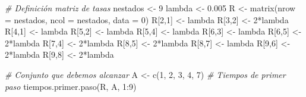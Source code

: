 \documentclass[
]{book}
\newenvironment{Shaded}{\begin{snugshade}}{\end{snugshade}}
\newcommand{\AttributeTok}[1]{\textcolor[rgb]{0.77,0.63,0.00}{#1}}
\newcommand{\CommentTok}[1]{\textcolor[rgb]{0.56,0.35,0.01}{\textit{#1}}}
\newcommand{\DecValTok}[1]{\textcolor[rgb]{0.00,0.00,0.81}{#1}}
\newcommand{\FloatTok}[1]{\textcolor[rgb]{0.00,0.00,0.81}{#1}}
\newcommand{\FunctionTok}[1]{\textcolor[rgb]{0.00,0.00,0.00}{#1}}
\newcommand{\NormalTok}[1]{#1}
\newcommand{\OtherTok}[1]{\textcolor[rgb]{0.56,0.35,0.01}{#1}}
\newcommand{\SpecialCharTok}[1]{\textcolor[rgb]{0.00,0.00,0.00}{#1}}
\theoremstyle{definition}
\theoremstyle{definition}
\theoremstyle{definition}
\theoremstyle{definition}
\theoremstyle{remark}
\begin{document}
\begin{Shaded}
\begin{Highlighting}[]
\CommentTok{\# Definición matriz de tasas}
\NormalTok{nestados }\OtherTok{\textless{}{-}} \DecValTok{9}
\NormalTok{lambda }\OtherTok{\textless{}{-}} \FloatTok{0.005}
\NormalTok{R }\OtherTok{\textless{}{-}} \FunctionTok{matrix}\NormalTok{(}\AttributeTok{nrow =}\NormalTok{ nestados, }\AttributeTok{ncol =}\NormalTok{ nestados, }\AttributeTok{data =} \DecValTok{0}\NormalTok{)}
\NormalTok{R[}\DecValTok{2}\NormalTok{,}\DecValTok{1}\NormalTok{] }\OtherTok{\textless{}{-}}\NormalTok{ lambda }
\NormalTok{R[}\DecValTok{3}\NormalTok{,}\DecValTok{2}\NormalTok{] }\OtherTok{\textless{}{-}} \DecValTok{2}\SpecialCharTok{*}\NormalTok{lambda }
\NormalTok{R[}\DecValTok{4}\NormalTok{,}\DecValTok{1}\NormalTok{] }\OtherTok{\textless{}{-}}\NormalTok{ lambda }
\NormalTok{R[}\DecValTok{5}\NormalTok{,}\DecValTok{2}\NormalTok{] }\OtherTok{\textless{}{-}}\NormalTok{ lambda }
\NormalTok{R[}\DecValTok{5}\NormalTok{,}\DecValTok{4}\NormalTok{] }\OtherTok{\textless{}{-}}\NormalTok{ lambda }
\NormalTok{R[}\DecValTok{6}\NormalTok{,}\DecValTok{3}\NormalTok{] }\OtherTok{\textless{}{-}}\NormalTok{ lambda }
\NormalTok{R[}\DecValTok{6}\NormalTok{,}\DecValTok{5}\NormalTok{] }\OtherTok{\textless{}{-}} \DecValTok{2}\SpecialCharTok{*}\NormalTok{lambda}
\NormalTok{R[}\DecValTok{7}\NormalTok{,}\DecValTok{4}\NormalTok{] }\OtherTok{\textless{}{-}} \DecValTok{2}\SpecialCharTok{*}\NormalTok{lambda}
\NormalTok{R[}\DecValTok{8}\NormalTok{,}\DecValTok{5}\NormalTok{] }\OtherTok{\textless{}{-}} \DecValTok{2}\SpecialCharTok{*}\NormalTok{lambda}
\NormalTok{R[}\DecValTok{8}\NormalTok{,}\DecValTok{7}\NormalTok{] }\OtherTok{\textless{}{-}}\NormalTok{ lambda}
\NormalTok{R[}\DecValTok{9}\NormalTok{,}\DecValTok{6}\NormalTok{] }\OtherTok{\textless{}{-}} \DecValTok{2}\SpecialCharTok{*}\NormalTok{lambda}
\NormalTok{R[}\DecValTok{9}\NormalTok{,}\DecValTok{8}\NormalTok{] }\OtherTok{\textless{}{-}} \DecValTok{2}\SpecialCharTok{*}\NormalTok{lambda}

\CommentTok{\# Conjunto que debemos alcanzar}
\NormalTok{A }\OtherTok{\textless{}{-}} \FunctionTok{c}\NormalTok{(}\DecValTok{1}\NormalTok{, }\DecValTok{2}\NormalTok{, }\DecValTok{3}\NormalTok{, }\DecValTok{4}\NormalTok{, }\DecValTok{7}\NormalTok{)}
\CommentTok{\# Tiempos de primer paso }
\FunctionTok{tiempos.primer.paso}\NormalTok{(R, A, }\DecValTok{1}\SpecialCharTok{:}\DecValTok{9}\NormalTok{)}
\end{Highlighting}
\end{Shaded}
\end{document}
